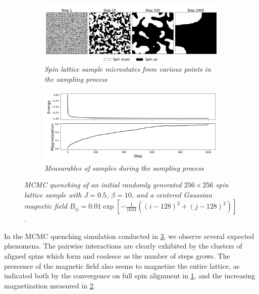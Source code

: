 \documentclass{article}
\begin{document}
\begin{figure}
    \begin{subfigure}{\textwidth}
        \includegraphics[width=\textwidth]{report_mcmc_gaussian}
        \centering
        \caption{\textit{
            Spin lattice sample microstates from various points in the sampling 
            process
        }}
        \label{fig:mcmc_gaussian_a}
    \end{subfigure}
    \begin{subfigure}{\textwidth}
        \includegraphics[width=\textwidth]{report_mcmc_gaussian_measurables}
        \centering
        \caption{\textit{Measurables of samples during the sampling process}}
        \label{fig:mcmc_gaussian_b}
    \end{subfigure}
    \centering
    \caption{\textit{
        MCMC quenching of an initial randomly generated $256 \times 256$ spin 
        lattice sample with $J = 0.5$, $\beta = 10$, and a centered Gaussian 
        magnetic field
        $B_{ij} = 0.01 \exp [-\frac{1}{1024}((i-128)^2 + (j-128)^2)]$. 
    }}
    \label{fig:mcmc_gaussian}
\end{figure}
In the MCMC quenching simulation conducted in \ref{fig:mcmc_gaussian}, we 
observe several expected phenomena. 
The pairwise interactions are clearly exhibited by the clusters of aligned spins 
which form and coalesce as the number of steps grows. 
The prescence of the magnetic field also seems to magnetize the entire lattice, 
as indicated both by the convergence on full spin alignment in 
\ref{fig:mcmc_gaussian_a}, and the increasing magnetization measured in 
\ref{fig:mcmc_gaussian_b}. 
\end{document}
